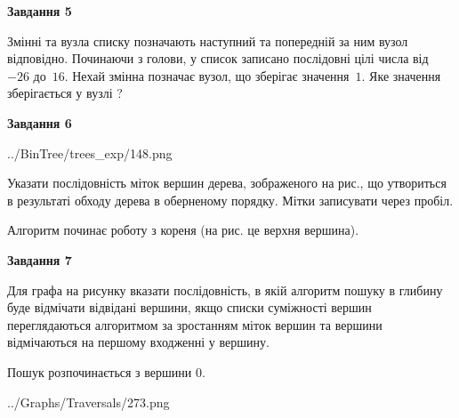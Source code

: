 \documentclass[12pt, ukrainian]{article}
\begin{document}
{\begin {large}
{\begin {center}\textbf{Завдання 5}\end {center}}\par
Змінні  та  вузла списку позначають наступний та попередній за ним вузол відповідно. Починаючи з голови, у список записано послідовні цілі числа від~$-26$ до~$16$. Нехай змінна  позначає вузол, що зберігає значення~$1$.
Яке значення зберігається у вузлі  ?\par
\newpage

{\begin {center}\textbf{Завдання 6}\end {center}}\par

\begin{center}
	{../BinTree/trees_exp/148.png}
\end{center}
Указати послідовність міток вершин дерева, зображеного на рис., що утвориться в результаті обходу дерева в оберненому порядку. Мітки записувати через пробіл.\par Алгоритм починає роботу з кореня (на рис. це верхня вершина).\par
\newpage

{\begin {center}\textbf{Завдання 7}\end {center}}\par
Для графа на рисунку вказати послідовність, в якій алгоритм пошуку в глибину буде відмічати відвідані вершини, якщо списки суміжності вершин переглядаються алгоритмом за зростанням міток вершин та вершини відмічаються на першому вход\-женні у вершину.\par
Пошук розпочинається з вершини 0.\par

\begin{center}
	{../Graphs/Traversals/273.png}
\end{center}\par
\newpage


\end{large}}
\end{document}
